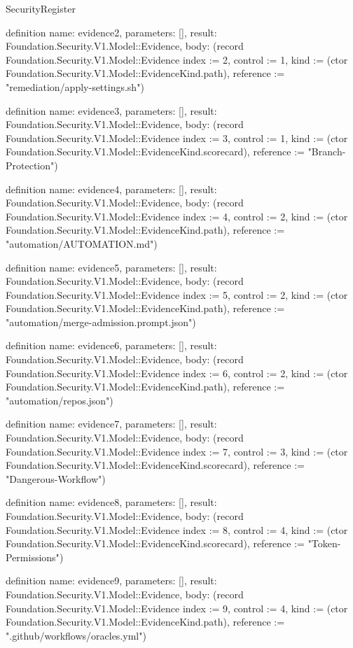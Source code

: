 \begin{lexlean}{SecurityRegister}
\begin{semanticmodule}
definition{
  name: evidence2,
  parameters: [],
  result: Foundation.Security.V1.Model::Evidence,
  body: (record Foundation.Security.V1.Model::Evidence {index := 2, control := 1, kind := (ctor Foundation.Security.V1.Model::EvidenceKind.path), reference := "remediation/apply-settings.sh"})
}

definition{
  name: evidence3,
  parameters: [],
  result: Foundation.Security.V1.Model::Evidence,
  body: (record Foundation.Security.V1.Model::Evidence {index := 3, control := 1, kind := (ctor Foundation.Security.V1.Model::EvidenceKind.scorecard), reference := "Branch-Protection"})
}

definition{
  name: evidence4,
  parameters: [],
  result: Foundation.Security.V1.Model::Evidence,
  body: (record Foundation.Security.V1.Model::Evidence {index := 4, control := 2, kind := (ctor Foundation.Security.V1.Model::EvidenceKind.path), reference := "automation/AUTOMATION.md"})
}

definition{
  name: evidence5,
  parameters: [],
  result: Foundation.Security.V1.Model::Evidence,
  body: (record Foundation.Security.V1.Model::Evidence {index := 5, control := 2, kind := (ctor Foundation.Security.V1.Model::EvidenceKind.path), reference := "automation/merge-admission.prompt.json"})
}

definition{
  name: evidence6,
  parameters: [],
  result: Foundation.Security.V1.Model::Evidence,
  body: (record Foundation.Security.V1.Model::Evidence {index := 6, control := 2, kind := (ctor Foundation.Security.V1.Model::EvidenceKind.path), reference := "automation/repos.json"})
}

definition{
  name: evidence7,
  parameters: [],
  result: Foundation.Security.V1.Model::Evidence,
  body: (record Foundation.Security.V1.Model::Evidence {index := 7, control := 3, kind := (ctor Foundation.Security.V1.Model::EvidenceKind.scorecard), reference := "Dangerous-Workflow"})
}

definition{
  name: evidence8,
  parameters: [],
  result: Foundation.Security.V1.Model::Evidence,
  body: (record Foundation.Security.V1.Model::Evidence {index := 8, control := 4, kind := (ctor Foundation.Security.V1.Model::EvidenceKind.scorecard), reference := "Token-Permissions"})
}

definition{
  name: evidence9,
  parameters: [],
  result: Foundation.Security.V1.Model::Evidence,
  body: (record Foundation.Security.V1.Model::Evidence {index := 9, control := 4, kind := (ctor Foundation.Security.V1.Model::EvidenceKind.path), reference := ".github/workflows/oracles.yml"})
}


\end{semanticmodule}
\end{lexlean}
